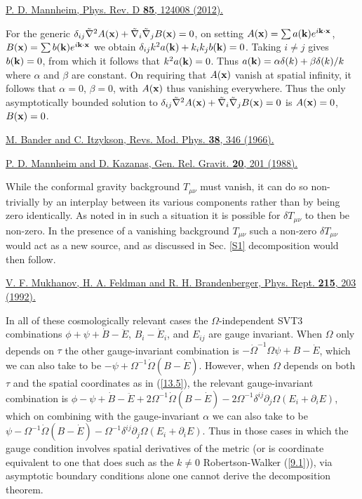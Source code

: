 \documentclass[aps,onecolumn,10pt]{revtex4}
\numberwithin{equation}{section}
\numberwithin{equation}{section}
\begin{document}
\begin{thebibliography}{99}
 

  \href{https://doi.org/10.1103/PhysRevD.85.124008}{P. D. Mannheim, Phys. Rev. D {\bf 85}, 124008 (2012).}

 For the generic $\delta_{ij}\tilde{\nabla}^2A({\bf x})+\tilde{\nabla}_i\tilde{\nabla}_jB({\bf x})=0$, on setting
$A({\bf x})=\sum a({\bf k})e^{i{\bf k}\cdot{\bf x}}$, $B({\bf x})=\sum b({\bf k})e^{i{\bf k}\cdot{\bf x}}$ we obtain $\delta_{ij}k^2a({\bf k})+k_ik_jb({\bf k})=0$. Taking $i\neq j$ gives $b({\bf k})=0$, from which it follows that $k^2a({\bf k})=0$. Thus $a({\bf k})=\alpha\delta(k)+\beta \delta(k)/k$ where $\alpha$ and $\beta$ are constant. On requiring that $A({\bf x})$ vanish at spatial infinity, it follows that $\alpha=0$, $\beta=0$, with $A({\bf x})$ thus vanishing everywhere. Thus the only asymptotically bounded solution to $\delta_{ij}\tilde{\nabla}^2A({\bf x})+\tilde{\nabla}_i\tilde{\nabla}_jB({\bf x})=0$ is $A({\bf x})=0$, $B({\bf x})=0$.

 \href{https://doi.org/10.1103/RevModPhys.38.346} {M. Bander and C. Itzykson, Revs. Mod. Phys. \textbf{38}, 346 (1966).}

 \href{https://doi.org/10.1007/BF00759181} {P. D. Mannheim and D. Kazanas, Gen. Rel. Gravit. \textbf{20}, 201 (1988).}

 While the conformal gravity background $T_{\mu\nu}$ must vanish, it can do so non-trivially by an interplay between its various components rather than by being zero identically. As noted in \cite{Amarasinghe2018}  in such a situation it is possible for $\delta T_{\mu\nu}$ to then be non-zero. In the presence of a vanishing background $T_{\mu\nu}$ such a non-zero $\delta T_{\mu\nu}$ would act as a new source, and as discussed in Sec. \ref{S1} decomposition would then follow. 

 \href{https://doi.org/10.1016/0370-1573(92)90044-Z} {V. F. Mukhanov, H. A. Feldman and R. H. Brandenberger, Phys. Rept. \textbf{215}, 203 (1992).}

 In all of these cosmologically relevant cases the  $\Omega$-independent SVT3 combinations $\phi + \psi + \dot B - \ddot E$,  $B_i-\dot{E}_i$, and $E_{ij}$ are gauge invariant. When $\Omega$ only depends on $\tau$ the other gauge-invariant combination is  $- \dot\Omega^{-1}\Omega \psi + B - \dot E$, which we can also take to be $-\psi+\Omega^{-1}\dot{\Omega}(B-\dot{E})$. However, when $\Omega$ depends on both $\tau$ and the spatial coordinates as in (\ref{13.5}), the relevant gauge-invariant combination is \cite{Amarasinghe2018}  $\phi-\psi+\dot{B}-\ddot{E}+2\Omega^{-1}\dot{\Omega}(B-\dot{E})-2\Omega^{-1}\delta^{ij}\partial_j\Omega(E_i+\partial_iE)$, which on combining with the gauge-invariant $\alpha$ we can also take to be $\psi-\Omega^{-1}\dot{\Omega}(B-\dot{E})-\Omega^{-1}\delta^{ij}\partial_j\Omega(E_i+\partial_iE)$. Thus in those cases in which the gauge condition involves spatial derivatives of the metric (or is coordinate equivalent to one that does such as the $k\neq 0$ Robertson-Walker (\ref{9.1})), via asymptotic boundary conditions alone one cannot derive the decomposition theorem.




\end{thebibliography}
\end{document}

